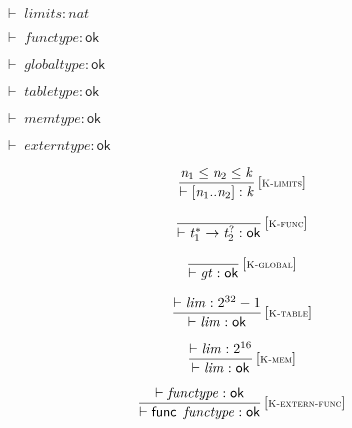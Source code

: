 \vspace{1ex}

$\boxed{{ \vdash }\;{\mathit{limits}} : {\mathit{nat}}}$

$\boxed{{ \vdash }\;{\mathit{functype}} : \mathsf{ok}}$

$\boxed{{ \vdash }\;{\mathit{globaltype}} : \mathsf{ok}}$

$\boxed{{ \vdash }\;{\mathit{tabletype}} : \mathsf{ok}}$

$\boxed{{ \vdash }\;{\mathit{memtype}} : \mathsf{ok}}$

$\boxed{{ \vdash }\;{\mathit{externtype}} : \mathsf{ok}}$

\vspace{1ex}

$$
\begin{array}{@{}c@{}}\displaystyle
\frac{
{\mathit{n}}_{{1}} \leq {\mathit{n}}_{{2}} \leq {\mathit{k}}
}{
{ \vdash }\;{}[{\mathit{n}}_{{1}} .. {\mathit{n}}_{{2}}] : {\mathit{k}}
} \, {[\textsc{\scriptsize K{-}limits}]}
\qquad
\end{array}
$$

$$
\begin{array}{@{}c@{}}\displaystyle
\frac{
}{
{ \vdash }\;{{\mathit{t}}_{{1}}^\ast} \rightarrow {{\mathit{t}}_{{2}}^?} : \mathsf{ok}
} \, {[\textsc{\scriptsize K{-}func}]}
\qquad
\end{array}
$$

$$
\begin{array}{@{}c@{}}\displaystyle
\frac{
}{
{ \vdash }\;{\mathit{gt}} : \mathsf{ok}
} \, {[\textsc{\scriptsize K{-}global}]}
\qquad
\end{array}
$$

$$
\begin{array}{@{}c@{}}\displaystyle
\frac{
{ \vdash }\;{\mathit{lim}} : {2^{32}} - 1
}{
{ \vdash }\;{\mathit{lim}} : \mathsf{ok}
} \, {[\textsc{\scriptsize K{-}table}]}
\qquad
\end{array}
$$

$$
\begin{array}{@{}c@{}}\displaystyle
\frac{
{ \vdash }\;{\mathit{lim}} : {2^{16}}
}{
{ \vdash }\;{\mathit{lim}} : \mathsf{ok}
} \, {[\textsc{\scriptsize K{-}mem}]}
\qquad
\end{array}
$$

\vspace{1ex}

$$
\begin{array}{@{}c@{}}\displaystyle
\frac{
{ \vdash }\;{\mathit{functype}} : \mathsf{ok}
}{
{ \vdash }\;\mathsf{func}~\,{\mathit{functype}} : \mathsf{ok}
} \, {[\textsc{\scriptsize K{-}extern{-}func}]}
\qquad
\end{array}
$$

